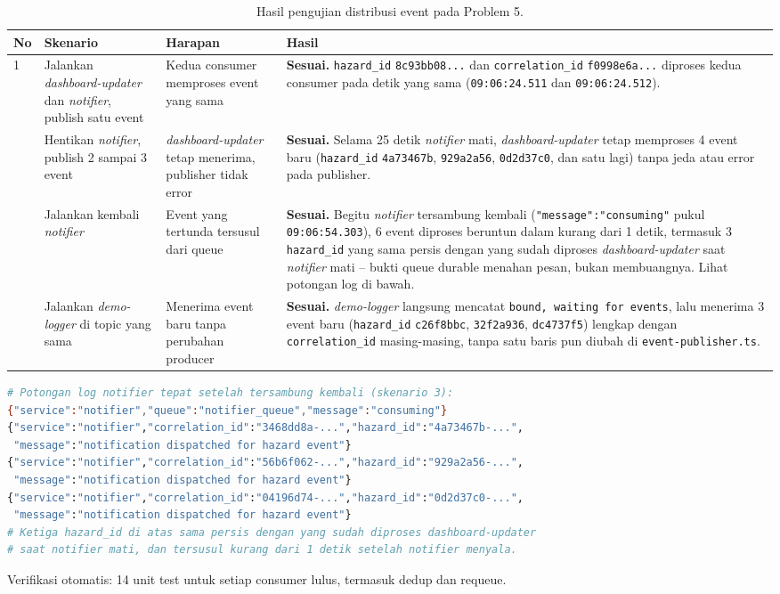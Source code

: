 \begin{table}[H]
  \centering
  \small
  \begin{tabularx}{\textwidth}{p{0.4cm}p{3.6cm}p{2.6cm}X}
    \toprule
    \textbf{No} & \textbf{Skenario} & \textbf{Harapan} & \textbf{Hasil} \\
    \midrule
    1 & Jalankan \textit{dashboard-updater} dan \textit{notifier}, publish satu event & Kedua consumer memproses event yang sama & \textbf{Sesuai.} \texttt{hazard\_id} \texttt{8c93bb08...} dan \texttt{correlation\_id} \texttt{f0998e6a...} diproses kedua consumer pada detik yang sama (\texttt{09:06:24.511} dan \texttt{09:06:24.512}). \\
    \addlinespace
    2 & Hentikan \textit{notifier}, publish 2 sampai 3 event & \textit{dashboard-updater} tetap menerima, publisher tidak error & \textbf{Sesuai.} Selama 25 detik \textit{notifier} mati, \textit{dashboard-updater} tetap memproses 4 event baru (\texttt{hazard\_id} \texttt{4a73467b}, \texttt{929a2a56}, \texttt{0d2d37c0}, dan satu lagi) tanpa jeda atau error pada publisher. \\
    \addlinespace
    3 & Jalankan kembali \textit{notifier} & Event yang tertunda tersusul dari queue & \textbf{Sesuai.} Begitu \textit{notifier} tersambung kembali (\texttt{"message":"consuming"} pukul \texttt{09:06:54.303}), 6 event diproses beruntun dalam kurang dari 1 detik, termasuk 3 \texttt{hazard\_id} yang sama persis dengan yang sudah diproses \textit{dashboard-updater} saat \textit{notifier} mati -- bukti queue durable menahan pesan, bukan membuangnya. Lihat potongan log di bawah. \\
    \addlinespace
    4 & Jalankan \textit{demo-logger} di topic yang sama & Menerima event baru tanpa perubahan producer & \textbf{Sesuai.} \textit{demo-logger} langsung mencatat \texttt{bound, waiting for events}, lalu menerima 3 event baru (\texttt{hazard\_id} \texttt{c26f8bbc}, \texttt{32f2a936}, \texttt{dc4737f5}) lengkap dengan \texttt{correlation\_id} masing-masing, tanpa satu baris pun diubah di \texttt{event-publisher.ts}. \\
    \bottomrule
  \end{tabularx}
  \caption{Hasil pengujian distribusi event pada Problem 5.}
  \label{tab:p5-bukti}
\end{table}

\begin{lstlisting}[style=code,language=bash]
# Potongan log notifier tepat setelah tersambung kembali (skenario 3):
{"service":"notifier","queue":"notifier_queue","message":"consuming"}
{"service":"notifier","correlation_id":"3468dd8a-...","hazard_id":"4a73467b-...",
 "message":"notification dispatched for hazard event"}
{"service":"notifier","correlation_id":"56b6f062-...","hazard_id":"929a2a56-...",
 "message":"notification dispatched for hazard event"}
{"service":"notifier","correlation_id":"04196d74-...","hazard_id":"0d2d37c0-...",
 "message":"notification dispatched for hazard event"}
# Ketiga hazard_id di atas sama persis dengan yang sudah diproses dashboard-updater
# saat notifier mati, dan tersusul kurang dari 1 detik setelah notifier menyala.
\end{lstlisting}

Verifikasi otomatis: 14 unit test untuk setiap consumer lulus, termasuk dedup dan
requeue.
